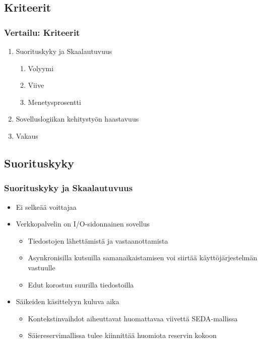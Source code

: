 \documentclass{beamer}
\begin{document}
\subsection{Kriteerit}
\begin{frame}
  \frametitle{Vertailu: Kriteerit}
  \begin{enumerate}
    \item Suorituskyky ja Skaalautuvuus
      \begin{enumerate}
        \item Volyymi
        \item Viive
        \item Menetysprosentti
      \end{enumerate}
    \item Sovelluslogiikan kehitystyön haastavuus
    \item Vakaus
  \end{enumerate}
\end{frame}
\subsection{Suorituskyky}
\begin{frame}
  \frametitle{Suorituskyky ja Skaalautuvuus}
  \begin{itemize}
    \item Ei selkeää voittajaa
    \item Verkkopalvelin on I/O-sidonnainen sovellus
      \begin{itemize}
        \item Tiedostojen lähettämistä ja vastaanottamista
        \item Asynkronisilla kutsuilla samanaikaistamisen
          voi siirtää käyttöjärjestelmän vastuulle
        \item Edut korostuu suurilla tiedostoilla
      \end{itemize}
    \item Säikeiden käsittelyyn kuluva aika
      \begin{itemize}
        \item Kontekstinvaihdot aiheuttavat huomattavaa viivettä
          SEDA-mallissa
        \item Säiereservimallissa tulee kiinnittää huomiota reservin kokoon
      \end{itemize}
  \end{itemize}
\end{frame}
\end{document}
